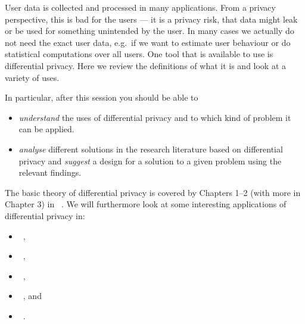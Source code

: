 User data is collected and processed in many applications.
From a privacy perspective, this is bad for the users --- it is a privacy risk,
that data might leak or be used for something unintended by the user.
In many cases we actually do not need the exact user data, e.g.\ if we want to 
estimate user behaviour or do statistical computations over all users.
One tool that is available to use is differential privacy.
Here we review the definitions of what it is and look at a variety of uses.

In particular, after this session you should be able to
\begin{itemize}
  \item \emph{understand} the uses of differential privacy and to which kind of 
    problem it can be applied.
  \item \emph{analyse} different solutions in the research literature based on 
    differential privacy and \emph{suggest} a design for a solution to a given 
    problem using the relevant findings.
\end{itemize}

The basic theory of differential privacy is covered by Chapters 1--2 (with more
in Chapter 3) in 
~\cite{DifferentialPrivacyBook}.
We will furthermore look at some interesting applications of differential 
privacy in:
\begin{itemize}
  \item {}~\cite{ChallengingDiffPriv},
  \item {}~\cite{BLIP-1},
  \item {}~\cite{BLIP-2},
  \item {}~\cite{RAPPOR}, and
  \item {}~\cite{RAPPOR-unknown}.
\end{itemize}
